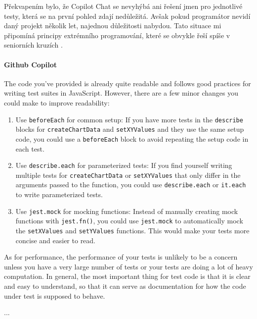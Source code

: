 \documentclass[FM,DP]{tulthesis}
\begin{document}
		Překvapením bylo, že Copilot Chat se nevyhýbá ani řešení jmen pro jednotlivé testy, která se na první pohled zdají nedůležitá. Avšak pokud programátor nevidí daný projekt několik let, najednou důležitosti nabydou. Tato situace mi připomíná principy extrémního programování, které se obvykle řeší spíše v seniorních kruzích \cite{parametrized_testing_fe} \cite{TDD}.
		
		\vspace{0.6em}
		\begin{tcolorbox}[colback=white,colframe=black]
			
			\paragraph{Github Copilot}
			The code you've provided is already quite readable and follows good practices for writing test suites in JavaScript. However, there are a few minor changes you could make to improve readability:
			
			\begin{enumerate}
				\item Use \verb|beforeEach| for common setup: If you have more tests in the \verb|describe| blocks for \verb|createChartData| and \verb|setXYValues| and they use the same setup code, you could use a \verb|beforeEach| block to avoid repeating the setup code in each test.
				
				\item Use \verb|describe.each| for parameterized tests: If you find yourself writing multiple tests for \verb|createChartData| or \verb|setXYValues| that only differ in the arguments passed to the function, you could use \verb|describe.each| or \verb|it.each| to write parameterized tests.
				
				\item Use \verb|jest.mock| for mocking functions: Instead of manually creating mock functions with \verb|jest.fn()|, you could use \verb|jest.mock| to automatically mock the \verb|setXValues| and \verb|setYValues| functions. This would make your tests more concise and easier to read.
			\end{enumerate}
			
			As for performance, the performance of your tests is unlikely to be a concern unless you have a very large number of tests or your tests are doing a lot of heavy computation. In general, the most important thing for test code is that it is clear and easy to understand, so that it can serve as documentation for how the code under test is supposed to behave.
			
			
			... \cite{parametrized_testing_fe}
		\end{tcolorbox}
		\vspace{0.6em}
		
\end{document}

